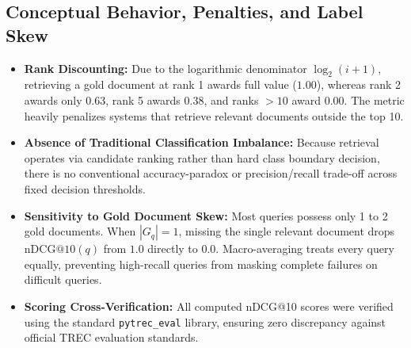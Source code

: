 \subsection{Conceptual Behavior, Penalties, and Label Skew}
\begin{itemize}
    \item \textbf{Rank Discounting:} Due to the logarithmic denominator $\log_2(i + 1)$, retrieving a gold document at rank 1 awards full value ($1.00$), whereas rank 2 awards only $0.63$, rank 5 awards $0.38$, and ranks $>10$ award $0.00$. The metric heavily penalizes systems that retrieve relevant documents outside the top 10.
    \item \textbf{Absence of Traditional Classification Imbalance:} Because retrieval operates via candidate ranking rather than hard class boundary decision, there is no conventional accuracy-paradox or precision/recall trade-off across fixed decision thresholds.
    \item \textbf{Sensitivity to Gold Document Skew:} Most queries possess only 1 to 2 gold documents. When $|G_q| = 1$, missing the single relevant document drops $\text{nDCG}@10(q)$ from $1.0$ directly to $0.0$. Macro-averaging treats every query equally, preventing high-recall queries from masking complete failures on difficult queries.
    \item \textbf{Scoring Cross-Verification:} All computed nDCG@10 scores were verified using the standard \texttt{pytrec\_eval} library, ensuring zero discrepancy against official TREC evaluation standards.
\end{itemize}
